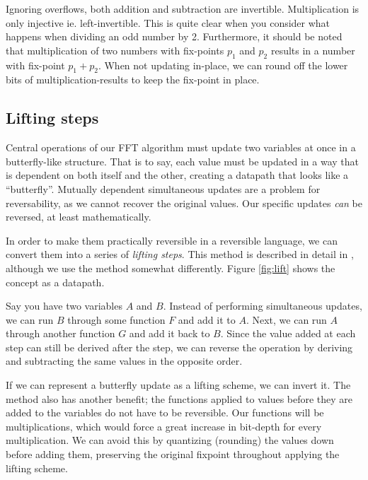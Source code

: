 Ignoring overflows, both addition and subtraction are invertible.
Multiplication is only injective ie. left-invertible.
This is quite clear when you consider what happens when dividing an odd number by 2.
Furthermore, it should be noted that multiplication of two numbers with fix-points $p_1$ and $p_2$
results in a number with fix-point $p_1 + p_2$.
When not updating in-place,
we can round off the lower bits of multiplication-results to keep the fix-point in place.

\subsection{Lifting steps}
Central operations of our FFT algorithm
must update two variables at once in a butterfly-like structure.
That is to say, each value must be updated in a way that is dependent on both itself and the other,
creating a datapath that looks like a ``butterfly''.
Mutually dependent simultaneous updates are a problem for reversability,
as we cannot recover the original values.
Our specific updates \textit{can} be reversed, at least mathematically.

In order to make them practically reversible in a reversible language,
we can convert them into a series of \textit{lifting steps}.
This method is described in detail in \cite{lifting1998},
although we use the method somewhat differently.
Figure \ref{fig:lift} shows the concept as a datapath.

Say you have two variables $A$ and $B$.
Instead of performing simultaneous updates,
we can run $B$ through some function $F$ and add it to $A$.
Next, we can run $A$ through another function $G$ and add it back to $B$.
Since the value added at each step can still be derived after the step,
we can reverse the operation by deriving and subtracting the same values in the opposite order.

If we can represent a butterfly update as a lifting scheme, we can invert it.
The method also has another benefit;
the functions applied to values before they are added to the variables do not have to be reversible.
Our functions will be multiplications,
which would force a great increase in bit-depth for every multiplication.
We can avoid this by quantizing (rounding) the values down before adding them,
preserving the original fixpoint throughout applying the lifting scheme.



